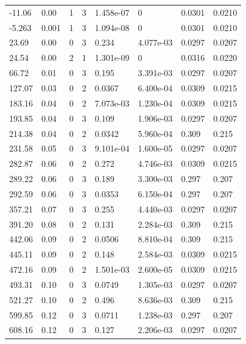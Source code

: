 \documentclass[preview]{standalone}
\begin{document}
{{\begin{tabular}{L{1.2cm}C{1.2cm} C{0.3cm}C{0.5cm} C{1.4cm}C{1.4cm} C{1.4cm}C{1.4cm}}
  -11.06  &  0.00  & 1     &  3 &  1.458e-07  & 0  & 0.0301 &  0.0210   \\ 
  -5.263  &  0.001  & 1     &  3 &  1.094e-08  & 0  & 0.0301 &  0.0210   \\ 
  23.69  &  0.00  & 0     &  3 &  0.234  & 4.077e-03  & 0.0297 &  0.0207   \\ 
  24.54  &  0.00  & 2     &  1 &  1.301e-09  & 0  & 0.0316 &  0.0220   \\ 
  66.72  &  0.01  & 0     &  3 &  0.195  & 3.391e-03  & 0.0297 &  0.0207   \\ 
  127.07  &  0.03  & 0     &  2 &  0.0367  & 6.400e-04  & 0.0309 &  0.0215   \\ 
  183.16  &  0.04  & 0     &  2 &  7.073e-03  & 1.230e-04  & 0.0309 &  0.0215   \\ 
  193.85  &  0.04  & 0     &  3 &  0.109  & 1.906e-03  & 0.0297 &  0.0207   \\ 
  214.38  &  0.04  & 0     &  2 &  0.0342  & 5.960e-04  & 0.309 &  0.215   \\ 
  231.58  &  0.05  & 0     &  3 &  9.101e-04  & 1.600e-05  & 0.0297 &  0.0207   \\ 
  282.87  &  0.06  & 0     &  2 &  0.272  & 4.746e-03  & 0.0309 &  0.0215   \\ 
  289.22  &  0.06  & 0     &  3 &  0.189  & 3.300e-03  & 0.297 &  0.207   \\ 
  292.59  &  0.06  & 0     &  3 &  0.0353  & 6.150e-04  & 0.297 &  0.207   \\ 
  357.21  &  0.07  & 0     &  3 &  0.255  & 4.440e-03  & 0.0297 &  0.0207   \\ 
  391.20  &  0.08  & 0     &  2 &  0.131  & 2.284e-03  & 0.309 &  0.215   \\ 
  442.06  &  0.09  & 0     &  2 &  0.0506  & 8.810e-04  & 0.309 &  0.215   \\ 
  445.11  &  0.09  & 0     &  2 &  0.148  & 2.584e-03  & 0.0309 &  0.0215   \\ 
  472.16  &  0.09  & 0     &  2 &  1.501e-03  & 2.600e-05  & 0.0309 &  0.0215   \\ 
  493.31  &  0.10  & 0     &  3 &  0.0749  & 1.305e-03  & 0.0297 &  0.0207   \\ 
  521.27  &  0.10  & 0     &  2 &  0.496  & 8.636e-03  & 0.309 &  0.215   \\ 
  599.85  &  0.12  & 0     &  3 &  0.0711  & 1.238e-03  & 0.297 &  0.207   \\ 
  608.16  &  0.12  & 0     &  3 &  0.127  & 2.206e-03  & 0.0297 &  0.0207   \\ 

\end{tabular}}}
\end{document}
